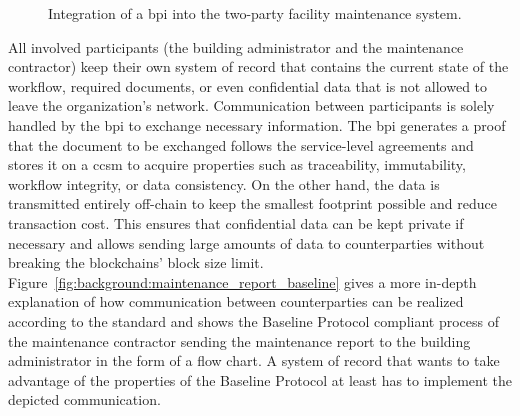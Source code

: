\begin{figure}[h]
    \caption{Integration of a \gls{bpi} into the two-party facility maintenance system.}
    \label{fig:background:maintenance_multiple_participants}
\end{figure}

All involved participants (the building administrator and the maintenance contractor) keep their own system of record that contains the current state of the workflow, required documents, or even confidential data that is not allowed to leave the organization's network. Communication between participants is solely handled by the \gls{bpi} to exchange necessary information. The \gls{bpi} generates a proof that the document to be exchanged follows the service-level agreements and stores it on a \gls{ccsm} to acquire properties such as traceability, immutability, workflow integrity, or data consistency. On the other hand, the data is transmitted entirely off-chain to keep the smallest footprint possible and reduce transaction cost. This ensures that confidential data can be kept private if necessary and allows sending large amounts of data to counterparties without breaking the blockchains' block size limit. Figure~\ref{fig:background:maintenance_report_baseline} gives a more in-depth explanation of how communication between counterparties can be realized according to the standard and shows the Baseline Protocol compliant process of the maintenance contractor sending the maintenance report to the building administrator in the form of a flow chart. A system of record that wants to take advantage of the properties of the Baseline Protocol at least has to implement the depicted communication.

